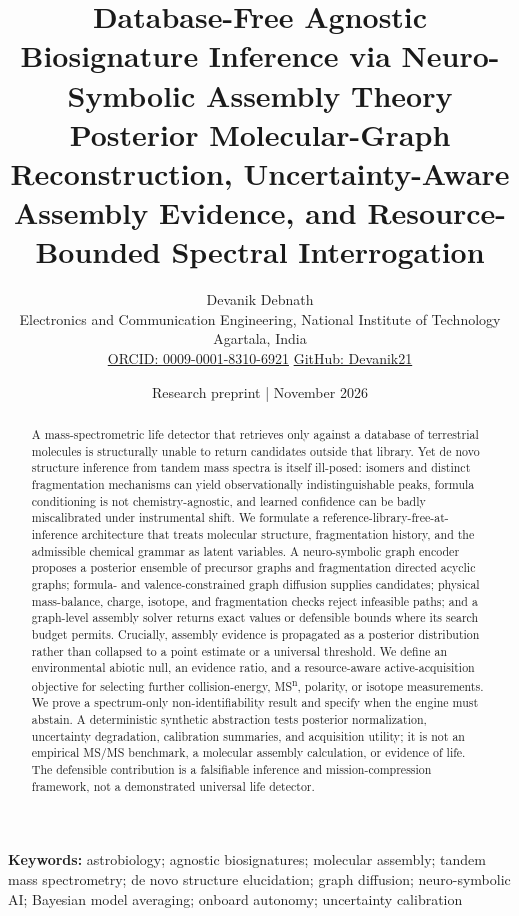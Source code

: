 \documentclass[10pt,a4paper]{article}
\title{\vspace{-1.2em}\bfseries Database-Free Agnostic Biosignature Inference via Neuro-Symbolic Assembly Theory\\[0.35em]\large Posterior Molecular-Graph Reconstruction, Uncertainty-Aware Assembly Evidence, and Resource-Bounded Spectral Interrogation}
\author{Devanik Debnath\\\small Electronics and Communication Engineering, National Institute of Technology Agartala, India\\\small \href{https://orcid.org/0009-0001-8310-6921}{ORCID: 0009-0001-8310-6921} \quad \href{https://github.com/Devanik21}{GitHub: Devanik21}}
\date{Research preprint \;|\; 28 November 2026}
\begin{document}
\maketitle
\begin{abstract}
A mass-spectrometric life detector that retrieves only against a database of terrestrial molecules is structurally unable to return candidates outside that library. Yet de novo structure inference from tandem mass spectra is itself ill-posed: isomers and distinct fragmentation mechanisms can yield observationally indistinguishable peaks, formula conditioning is not chemistry-agnostic, and learned confidence can be badly miscalibrated under instrumental shift. We formulate a reference-library-free-at-inference architecture that treats molecular structure, fragmentation history, and the admissible chemical grammar as latent variables. A neuro-symbolic graph encoder proposes a posterior ensemble of precursor graphs and fragmentation directed acyclic graphs; formula- and valence-constrained graph diffusion supplies candidates; physical mass-balance, charge, isotope, and fragmentation checks reject infeasible paths; and a graph-level assembly solver returns exact values or defensible bounds where its search budget permits. Crucially, assembly evidence is propagated as a posterior distribution rather than collapsed to a point estimate or a universal threshold. We define an environmental abiotic null, an evidence ratio, and a resource-aware active-acquisition objective for selecting further collision-energy, MS\textsuperscript{n}, polarity, or isotope measurements. We prove a spectrum-only non-identifiability result and specify when the engine must abstain. A deterministic synthetic abstraction tests posterior normalization, uncertainty degradation, calibration summaries, and acquisition utility; it is not an empirical MS/MS benchmark, a molecular assembly calculation, or evidence of life. The defensible contribution is a falsifiable inference and mission-compression framework, not a demonstrated universal life detector.
\end{abstract}
\textbf{Keywords:} astrobiology; agnostic biosignatures; molecular assembly; tandem mass spectrometry; de novo structure elucidation; graph diffusion; neuro-symbolic AI; Bayesian model averaging; onboard autonomy; uncertainty calibration
\end{document}
